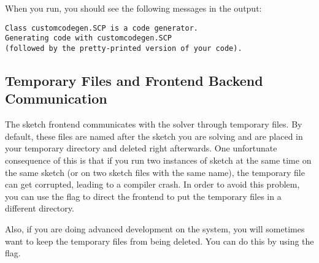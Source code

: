 When you run, you should see the following messages in the output:
\begin{lstlisting}
Class customcodegen.SCP is a code generator.
Generating code with customcodegen.SCP
(followed by the pretty-printed version of your code).
\end{lstlisting}



\subsection{Temporary Files and Frontend Backend Communication}

The sketch frontend communicates with the solver through temporary files. 
By default, these files are named after the sketch you are solving and 
are placed in your temporary directory and deleted right afterwards. One 
unfortunate consequence of this is that if you run two instances of sketch at the same 
time on the same sketch (or on two sketch files with the same name), the temporary file
can get corrupted, leading to a compiler crash. In order to avoid this problem, you can use the flag 
 to direct the frontend to put the temporary files in a different directory. 


Also, if you are doing advanced development on the system, you will sometimes want to keep 
the temporary files from being deleted. You can do this by using the  flag.


